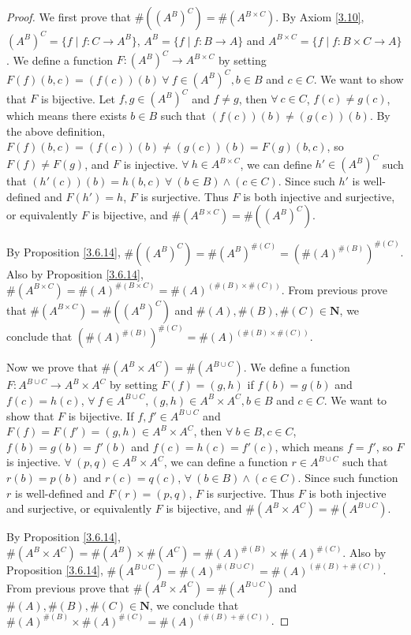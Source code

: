 \begin{proof}
We first prove that \(\#((A^B)^C) = \#(A^{B \times C})\).
By Axiom \ref{3.10}, \((A^B)^C = \{f \mid f : C \to A^B\}\), \(A^B = \{f \mid f : B \to A\}\) and \(A^{B \times C} = \{f \mid f : B \times C \to A\}\).
We define a function \(F : (A^B)^C \to A^{B \times C}\) by setting \(F(f)(b, c) = (f(c))(b) \ \forall\ f \in (A^B)^C, b \in B\) and \(c \in C\).
We want to show that \(F\) is bijective.
Let \(f, g \in (A^B)^C\) and \(f \neq g\), then \(\forall\ c \in C\), \(f(c) \neq g(c)\), which means there exists \(b \in B\) such that \((f(c))(b) \neq (g(c))(b)\).
By the above definition, \(F(f)(b, c) = (f(c))(b) \neq (g(c))(b) = F(g)(b, c)\), so \(F(f) \neq F(g)\), and \(F\) is injective.
\(\forall\ h \in A^{B \times C}\), we can define \(h' \in (A^B)^C\) such that \((h'(c))(b) = h(b, c) \ \forall\ (b \in B) \land (c \in C)\).
Since such \(h'\) is well-defined and \(F(h') = h\), \(F\) is surjective.
Thus \(F\) is both injective and surjective, or equivalently \(F\) is bijective, and \(\#(A^{B \times C}) = \#((A^B)^C)\).

By Proposition \ref{3.6.14}, \(\#((A^B)^C) = \#(A^B)^{\#(C)} = (\#(A)^{\#(B)})^{\#(C)}\).
Also by Proposition \ref{3.6.14}, \(\#(A^{B \times C}) = \#(A)^{\#(B \times C)} = \#(A)^{(\#(B) \times \#(C))}\).
From previous prove that \(\#(A^{B \times C}) = \#((A^B)^C)\) and \(\#(A), \#(B), \#(C) \in \mathbf{N}\), we conclude that \((\#(A)^{\#(B)})^{\#(C)} = \#(A)^{(\#(B) \times \#(C))}\).

Now we prove that \(\#(A^B \times A^C) = \#(A^{B \cup C})\).
We define a function \(F : A^{B \cup C} \to A^B \times A^C\) by setting \(F(f) = (g, h)\) if \(f(b) = g(b)\) and \(f(c) = h(c)\), \(\forall\ f \in A^{B \cup C}, (g, h) \in A^B \times A^C, b \in B\) and \(c \in C\).
We want to show that \(F\) is bijective.
If \(f, f' \in A^{B \cup C}\) and \(F(f) = F(f') = (g, h) \in A^B \times A^C\), then \(\forall\ b \in B, c \in C\), \(f(b) = g(b) = f'(b)\) and \(f(c) = h(c) = f'(c)\), which means \(f = f'\), so \(F\) is injective.
\(\forall\ (p, q) \in A^B \times A^C\), we can define a function \(r \in A^{B \cup C}\) such that \(r(b) = p(b)\) and \(r(c) = q(c)\), \(\forall\ (b \in B) \land (c \in C)\).
Since such function \(r\) is well-defined and \(F(r) = (p, q)\), \(F\) is surjective.
Thus \(F\) is both injective and surjective, or equivalently \(F\) is bijective, and \(\#(A^B \times A^C) = \#(A^{B \cup C})\).

By Proposition \ref{3.6.14}, \(\#(A^B \times A^C) = \#(A^B) \times \#(A^C) = \#(A)^{\#(B)} \times \#(A)^{\#(C)}\).
Also by Proposition \ref{3.6.14}, \(\#(A^{B \cup C}) = \#(A)^{\#(B \cup C)} = \#(A)^{(\#(B) + \#(C))}\).
From previous prove that \(\#(A^B \times A^C) = \#(A^{B \cup C})\) and \(\#(A), \#(B), \#(C) \in \mathbf{N}\), we conclude that \(\#(A)^{\#(B)} \times \#(A)^{\#(C)} = \#(A)^{(\#(B) + \#(C))}\).
\end{proof}

